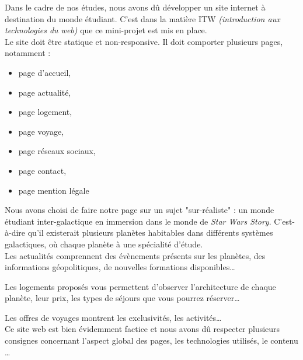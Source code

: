 Dans le cadre de nos études, nous avons dû développer un site internet à destination du monde étudiant.
C'est dans la matière ITW \textit{(introduction aux technologies du web)} que ce mini-projet est mis en place.
\\
Le site doit être statique et non-responsive. Il doit comporter plusieurs pages, notamment :
\begin{itemize}
    \item page d'accueil,
    \item page actualité,
    \item page logement,
    \item page voyage,
    \item page réseaux sociaux,
    \item page contact,
    \item page mention légale
\end{itemize}

\vspace{1\baselineskip}

Nous avons choisi de faire notre page sur un sujet "sur-réaliste" : un monde étudiant inter-galactique en immersion dans le monde de \textit{Star Wars Story}.
C'est-à-dire qu'il existerait plusieurs planètes habitables dans différents systèmes galactiques, où chaque planète à une spécialité d'étude.\\


Les actualités comprennent des évènements présents sur les planètes, des informations géopolitiques, de nouvelles formations disponibles\ldots

Les logements proposés vous permettent d'observer l'architecture de chaque planète, leur prix, les types de séjours que vous pourrez réserver\ldots

Les offres de voyages montrent les exclusivités, les activités\ldots \\


Ce site web est bien évidemment factice et nous avons dû respecter plusieurs consignes concernant l'aspect global des pages, les technologies utilisés, le contenu \ldots